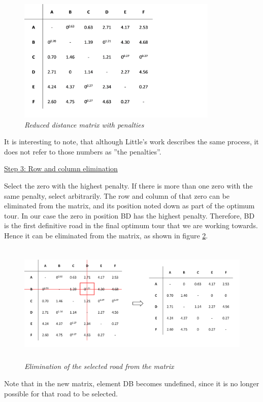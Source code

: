 \begin{figure}[H] 
	\centering
	\includegraphics[height=5.9cm]{dmpenalties}
	\vspace{-3mm}
	\caption{\textsl{Reduced distance matrix with penalties}}
	\label{dmpenalties}
\end{figure}	
\noindent It is interesting to note, that although Little’s work describes the same process, it does not refer to those numbers as ''the penalties''.
	
\vspace{5mm}	

\noindent
\underline{Step 3: Row and column elimination}
\vspace{1mm}

\noindent
Select the zero with the highest penalty. If there is more than one zero with the same penalty, select arbitrarily. The row and column of that zero can be eliminated from the matrix, and its position noted down as part of the optimum tour. In our case the zero in position BD has the highest penalty. Therefore, BD is the first definitive road in the final optimum tour that we are working towards. Hence it can be eliminated from the matrix, as shown in figure \ref{dmelimination2}.

\begin{figure}[H] 
	\centering
	\includegraphics[height=5.8cm]{dmelimination2}
	\vspace{-4mm}
	\caption{\textsl{Elimination of the selected road from the matrix}}
	\label{dmelimination2}
\end{figure}
\noindent Note that in the new matrix, element DB becomes undefined, since it is no longer possible for that road to be selected.

